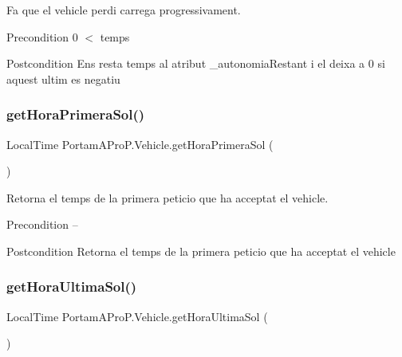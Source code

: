 Fa que el vehicle perdi carrega progressivament. 

\begin{DoxyPrecond}{Precondition}
0 $<$ temps 
\end{DoxyPrecond}
\begin{DoxyPostcond}{Postcondition}
Ens resta temps al atribut \+\_\+autonomia\+Restant i el deixa a 0 si aquest ultim es negatiu 
\end{DoxyPostcond}
\mbox{\label{class_portam_a_pro_p_1_1_vehicle_a5cdfe0d84974985a89a218c5f8e3a554}} 
\subsubsection{\texorpdfstring{get\+Hora\+Primera\+Sol()}{getHoraPrimeraSol()}}
{\footnotesize\ttfamily Local\+Time Portam\+A\+Pro\+P.\+Vehicle.\+get\+Hora\+Primera\+Sol (\begin{DoxyParamCaption}{ }\end{DoxyParamCaption})}



Retorna el temps de la primera peticio que ha acceptat el vehicle. 

\begin{DoxyPrecond}{Precondition}
-- 
\end{DoxyPrecond}
\begin{DoxyPostcond}{Postcondition}
Retorna el temps de la primera peticio que ha acceptat el vehicle 
\end{DoxyPostcond}
\mbox{\label{class_portam_a_pro_p_1_1_vehicle_ac4b240efbba88cd805bdc9cdff58785d}} 
\subsubsection{\texorpdfstring{get\+Hora\+Ultima\+Sol()}{getHoraUltimaSol()}}
{\footnotesize\ttfamily Local\+Time Portam\+A\+Pro\+P.\+Vehicle.\+get\+Hora\+Ultima\+Sol (\begin{DoxyParamCaption}{ }\end{DoxyParamCaption})}



